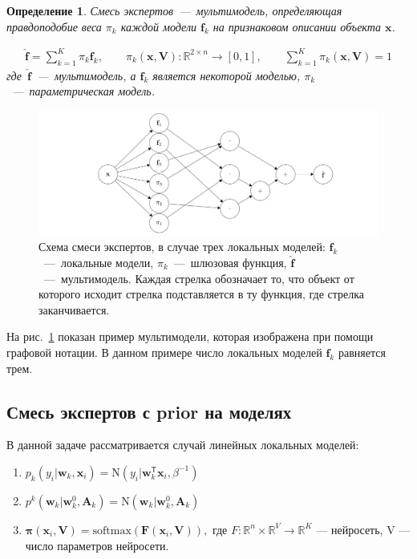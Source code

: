 \documentclass[12pt, twoside]{article}
\newtheorem{definition}{Определение}[section]
\numberwithin{equation}{section}
\begin{document}
\begin{definition}
Смесь экспертов~---~мультимодель, определяющая правдоподобие веса $\pi_k$ каждой модели $\textbf{f}_k$ на признаковом описании объекта $\textbf{x}$.

\begin{equation}
\label{eq:st:2}
\begin{aligned}
\hat{\mathbf{f}} = \sum_{k=1}^{K}\pi_{k}\mathbf{f}_k, \qquad \pi_{k}\left(\textbf{x}, \textbf{V}\right):\mathbb{R}^{2\times n} \to [0, 1], \qquad \sum_{k=1}^{K}\pi_{k}\left(\textbf{x}, \textbf{V}\right) = 1
\end{aligned}
\end{equation}
где~$\hat{\mathbf{f}}$~---~мультимодель, а $\mathbf{f}_k$ является некоторой моделью, $\pi_k$~---~параметрическая модель.
\end{definition}

\begin{figure}[h!t]\center
\includegraphics[width=1\textwidth]{result/scheme}
\caption{Схема смеси экспертов, в случае трех локальных моделей: $\textbf{f}_k$~---~локальные модели, $\pi_k$~---~шлюзовая функция, $\hat{\mathbf{f}}$~---~мультимодель. Каждая стрелка обозначает то, что объект от которого исходит стрелка подставляется в ту функция, где стрелка заканчивается.}
\label{scheme:1}
\end{figure}

На рис.~\ref{scheme:1} показан пример мультимодели, которая изображена при помощи графовой нотации. В данном примере число локальных моделей $\textbf{f}_k$ равняется трем.

\subsection{Смесь экспертов с prior на моделях}
В данной задаче рассматривается случай линейных локальных моделей:
\begin{enumerate}
	\item $p_{k}\left(y_{i}|\textbf{w}_{k}, \textbf{x}_{i}\right) = \text{N}\left(y_{i}|\textbf{w}_{k}^{\mathsf{T}}\textbf{x}_{i}, \beta^{-1}\right)$
	\item $p^{k}\left(\textbf{w}_{k}|\textbf{w}^{0}_{k}, \textbf{A}_{k}\right) = \text{N}\left(\textbf{w}_{k}|\textbf{w}^{0}_{k}, \textbf{A}_{k}\right)$
	\item $\bm{\pi}\left(\textbf{x}_{i}, \textbf{V}\right) = \text{softmax}\left(\textbf{F}\left(\textbf{x}_{i}, \textbf{V}\right)\right),$ где $F : \mathbb{R}^{n}\times\mathbb{R}^{V}\to \mathbb{R}^{K}$ --- нейросеть, V --- число параметров нейросети. 
\end{enumerate}
\end{document}
